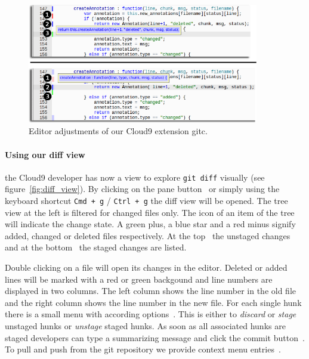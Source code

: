 \begin{figure}
   \centering
   \includegraphics[width=0.9\textwidth]{images/extension_tooltip_comparison.png}
   \caption{Editor adjustments of our Cloud9 extension gitc.}
   \label{fig:editor}
\end{figure}

\paragraph{Using our diff view} the Cloud9 developer has now a view to explore \texttt{git diff} visually (see figure~\ref{fig:diff_view}).
By clicking on the pane button~ or simply using the keyboard shortcut  \texttt{Cmd + g} / \texttt{Ctrl + g} the diff view will be opened.
The tree view at the left is filtered for changed files only.
The icon of an item of the tree will indicate the change state.
A green plus, a blue star and a red minus signify added, changed or deleted files respectively.
At the top~ the unstaged changes and at the bottom~ the staged changes are listed.

Double clicking on a file will open its changes in the editor.
Deleted or added lines will be marked with a red or green backgound and line numbers are displayed in two columns.
The left column shows the line number in the old file and the right column shows the line number in the new file.
For each single hunk there is a small menu with according options~.
This is either to \emph{discard} or \emph{stage} unstaged hunks or \emph{unstage} staged hunks.
As soon as all associated hunks are staged developers can type a summarizing message and click the commit button~.
To pull and push from the git repository we provide context menu entries~.

